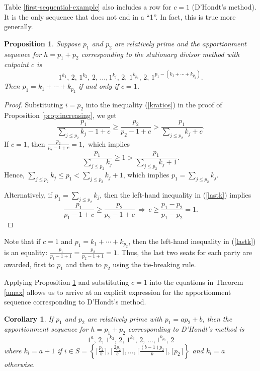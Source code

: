 \documentclass[pdflatex,sn-mathphys-num]{sn-jnl}
\theoremstyle{thmstyleone}%
\newtheorem{proposition}{Proposition}%
\newtheorem{corollary}{Corollary}
\theoremstyle{thmstyletwo}%
\theoremstyle{thmstylethree}%
\begin{document}
Table  \ref{first-sequential-example} also includes a row for $c=1$ (D'Hondt's method).  It is the only sequence that does not end in a ``1''.  In fact, this is true more generally.

 \begin{proposition} \label{prop:c1}
Suppose $p_1$ and $p_2$  are relatively prime and the apportionment sequence for $h = p_1 + p_2$ corresponding to the stationary divisor method with cutpoint $c$ is
 $$1^{k_1}, \,  2, \,1^{k_2}, \,  2, \,  \ldots, 1^{k_j}, \,  2, \, 1^{k_{p_2}}, \, 2 , \, 1^{p_1-(k_1+\cdots + k_{p_2})}.$$ 
Then $p_1=k_1+ \cdots + k_{p_2}$ if and only if $c=1$.
\end{proposition}
\begin{proof}
Substituting $i=p_2$ into the inequality (\ref{kratios}) in the proof of Proposition \ref{prop:increasing}, we get 
\begin{equation}\label{lastk}
\frac{p_1}{\sum_{j \le p_2} k_j-1+c}  \ge \frac{p_2}{p_2-1+c}>   \frac{p_1}{\sum_{j \le p_2} k_j+c}.\end{equation}
If $c=1$, then $ \frac{p_2}{p_2-1+c}=1,$ which implies
$$\frac{p_1}{\sum_{j \le p_2} k_j} \ge 1 >   \frac{p_1}{\sum_{j \le p_2} k_j+1}.$$
Hence, $\sum_{j \le p_2} k_j\le p_1 < \sum_{j \le p_2} k_j+1$, which implies $p_1 =\sum_{j \le p_2} k_j$.

Alternatively, if  $p_1 =\sum_{j \le p_2} k_j$, then the left-hand inequality  in (\ref{lastk}) implies
$$\frac{p_1}{p_1-1+c}  \ge \frac{p_2}{p_2-1+c} \, \Rightarrow \, c \ge \frac{p_1-p_2}{p_1-p_2}=1.$$ \end{proof}

Note that if $c=1$ and $p_1=k_1+ \cdots + k_{p_2}$, then the left-hand inequality  in (\ref{lastk}) is an equality: $\frac{p_1}{p_1-1+1} = \frac{p_2}{p_2-1+1}=1.$ Thus, the last two seats for each party are awarded, first to $p_1$ and then to $p_2$ using the tie-breaking rule.

Applying Proposition \ref{prop:c1} and substituting $c=1$ into the equations in Theorem \ref{amax} allows us to arrive at an explicit expression for the apportionment sequence corresponding to D'Hondt's method.


\begin{corollary}
If $p_1$ and $p_2$  are relatively prime with $p_1=ap_2+b$, then  the apportionment sequence for $h = p_1 + p_2$  corresponding to D'Hondt's method is
$$ 1^a, \, 2, \, 1^{k_2}, \, 2, \, 1^{k_3}, \, 2, \, \ldots,  1^{k_{p_2}}, \, 2$$
where $k_i = a+1$ if $i \in S=\left\{\lceil \frac{p_2}{b} \rceil, \lceil \frac{2p_2}{b} \rceil, \ldots, \lceil \frac{(b-1)p_2}{b} \rceil, \lceil  p_2\rceil\right\}$ and $k_i = a$ otherwise. \end{corollary}
\end{document}
